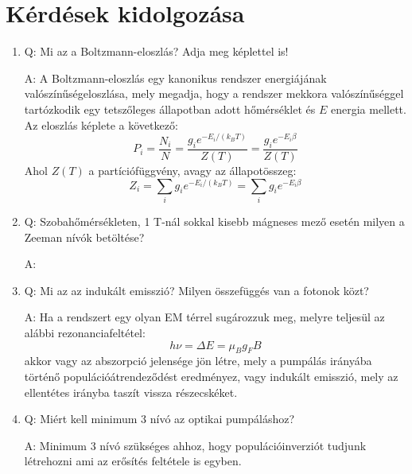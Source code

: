 \section{Kérdések kidolgozása}
\begin{enumerate}
    \item Q: Mi az a Boltzmann-eloszlás? Adja meg képlettel is!
    \begin{displayquote}
        A: A Boltzmann-eloszlás egy kanonikus rendszer energiájának valószínűségeloszlása, mely megadja, hogy a rendszer mekkora valószínűséggel tartózkodik egy tetszőleges állapotban adott hőmérséklet és $E$ energia mellett. Az eloszlás képlete a következő:
        \begin{equation}
        P_{i}
        =
        \frac{N_{i}}{N}
        =
        \frac{g_{i} e^{-E_{i} / \left( k_{B} T \right)}}{Z \left( T \right)}
        =
        \frac{g_{i} e^{-E_{i} \beta}}{Z \left( T \right)}
        \end{equation}
Ahol $Z \left( T \right)$ a partíciófüggvény, avagy az állapotösszeg:
		\begin{equation}
		Z_{i}
		=
		\sum_{i} g_{i} e^{-E_{i} / \left( k_{B} T \right)}
		=
		\sum_{i} g_{i} e^{-E_{i} \beta}
		\end{equation}
    \end{displayquote}
	
    \item Q: Szobahőmérsékleten, 1 T-nál sokkal kisebb mágneses mező esetén milyen a Zeeman nívók betöltése?
    \begin{displayquote}
    	A: 
    \end{displayquote}
    
    \item Q: Mi az az indukált emisszió? Milyen összefüggés van a fotonok közt?
    \begin{displayquote}
    	A: Ha a rendszert egy olyan EM térrel sugározzuk meg, melyre teljesül az alábbi rezonanciafeltétel:
    		\begin{equation}
    		h\nu
    		=
    		\Delta E
    		=
    		\mu_{B} g_{F} B
    		\end{equation}
akkor vagy az abszorpció jelensége jön létre, mely a pumpálás irányába történő populációátrendeződést eredményez, vagy indukált emisszió, mely az ellentétes irányba taszít vissza részecskéket.
    \end{displayquote}
    
    \item Q: Miért kell minimum 3 nívó az optikai pumpáláshoz?
    \begin{displayquote}
    	A: Minimum $3$ nívó szükséges ahhoz, hogy populációinverziót tudjunk létrehozni ami az erősítés feltétele is egyben.
    \end{displayquote}
    

\end{enumerate}
